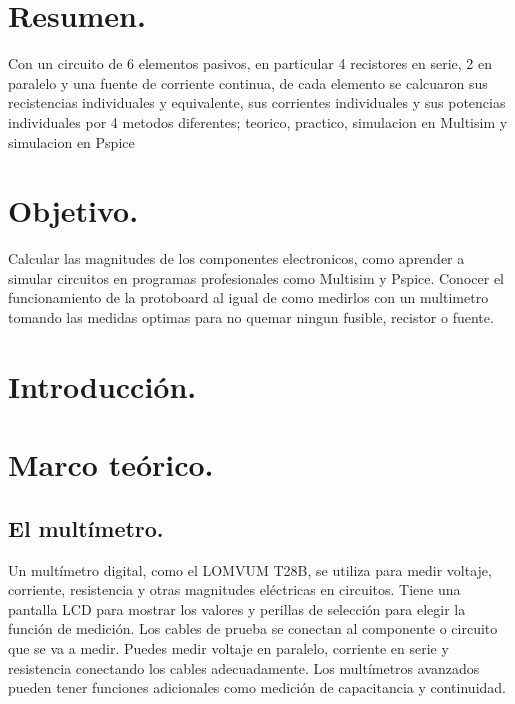\documentclass[10pt]{article}
\begin{document}
\section{Resumen.}
Con un circuito de 6 elementos pasivos, en particular 4 recistores en serie, 2 en paralelo y una fuente de corriente continua,  de cada elemento se calcuaron sus recistencias individuales y equivalente, sus corrientes individuales y sus potencias individuales por 4 metodos diferentes; teorico, practico, simulacion en Multisim y simulacion en Pspice 

\begin{multicols}{2}

\section{Objetivo.}
Calcular las magnitudes de los componentes electronicos, como aprender a simular circuitos en programas profesionales como Multisim y Pspice. Conocer el funcionamiento de la protoboard al igual de como medirlos con un multimetro tomando las medidas optimas para no quemar ningun fusible, recistor o fuente.


\section{Introducción.}



\section{Marco teórico.}

\subsection{El multímetro.}
Un multímetro digital, como el LOMVUM T28B, se utiliza para medir voltaje, corriente, resistencia y otras magnitudes eléctricas en circuitos. Tiene una pantalla LCD para mostrar los valores y perillas de selección para elegir la función de medición. Los cables de prueba se conectan al componente o circuito que se va a medir. Puedes medir voltaje en paralelo, corriente en serie y resistencia conectando los cables adecuadamente. Los multímetros avanzados pueden tener funciones adicionales como medición de capacitancia y continuidad. 
	

\end{multicols}
\end{document}
